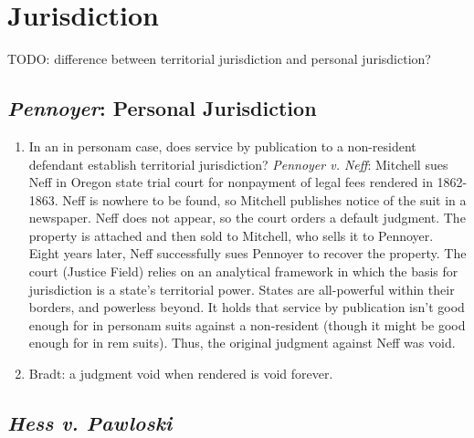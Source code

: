 \section{Jurisdiction}

TODO: difference between territorial jurisdiction and personal jurisdiction?

\subsection{\emph{Pennoyer}: Personal Jurisdiction}

\begin{enumerate}
    \item  In an in personam case, does service by publication to a non-resident defendant establish territorial jurisdiction? \emph{Pennoyer v. Neff}:
Mitchell sues Neff in Oregon state trial court for nonpayment of legal fees rendered in 1862-1863. Neff is nowhere to be found, so Mitchell publishes notice of the suit in a newspaper. Neff does not appear, so the court orders a default judgment. The property is attached and then sold to Mitchell, who sells it to Pennoyer. Eight years later, Neff successfully sues Pennoyer to recover the property. The court (Justice Field) relies on an analytical framework in which the basis for jurisdiction is a state's territorial power. States are all-powerful within their borders, and powerless beyond. It holds that service by publication isn't good enough for in personam suits against a non-resident (though it might be good enough for in rem suits). Thus, the original judgment against Neff was void.
    \item Bradt: a judgment void when rendered is void forever.
\end{enumerate}

\subsection{\emph{Hess v. Pawloski}}

